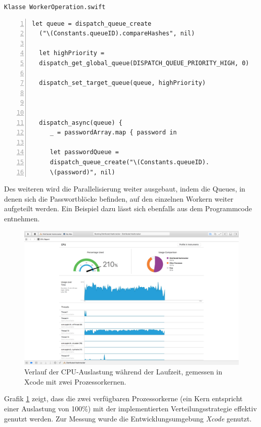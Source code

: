 \texttt{Klasse WorkerOperation.swift}
\begin{lstlisting}[basicstyle=\ttfamily,numbers=left,numberstyle=\footnotesize\ttfamily,backgroundcolor=\color{sourcegray}]
  let queue = dispatch_queue_create
  ("\(Constants.queueID).compareHashes", nil)
  
  let highPriority = 
  dispatch_get_global_queue(DISPATCH_QUEUE_PRIORITY_HIGH, 0)
  
  dispatch_set_target_queue(queue, highPriority)
  
  
  
  dispatch_async(queue) {
     _ = passwordArray.map { password in
     
     let passwordQueue = 
     dispatch_queue_create("\(Constants.queueID).
     \(password)", nil)
\end{lstlisting}

Des weiteren wird die Parallelisierung weiter ausgebaut, indem die Queues, in denen sich die Passwortblöcke befinden, auf den einzelnen Workern weiter  aufgeteilt werden. Ein Beispiel dazu lässt sich ebenfalls aus dem Programmcode entnehmen. \\

\begin{figure}[!ht]
	\centering
		\includegraphics[natwidth=1200pt, natheight=349pt, width=1.0\textwidth]{images/screenshot_cpu.png}
	\caption{Verlauf der CPU-Auslastung während der Laufzeit, gemessen in Xcode mit zwei Prozessorkernen.}
	\label{fig:screenshotCPU}
\end{figure}


Grafik \ref{fig:screenshotCPU} zeigt, dass die zwei verfügbaren Prozessorkerne (ein Kern entspricht einer Auslastung von 100\%) mit der implementierten Verteilungsstrategie effektiv genutzt werden. Zur Messung wurde die Entwicklungsumgebung \emph{Xcode} genutzt. 

